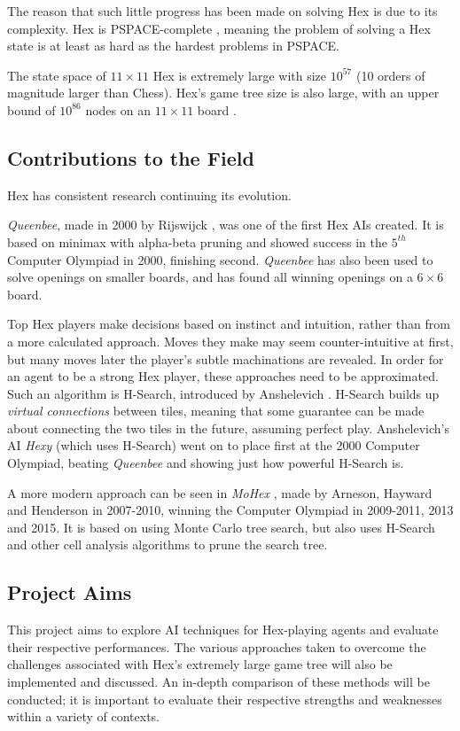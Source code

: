 The reason that such little progress has been made on solving Hex is due to its complexity. Hex is PSPACE-complete \cite{pspace}, meaning the problem of solving a Hex state is at least as hard as the hardest problems in PSPACE.

The state space of $11 \times 11$ Hex is extremely large with size $10^{57}$ (10 orders of magnitude larger than Chess). Hex's game tree size is also large, with an upper bound of $10^{86}$ nodes on an $11 \times 11$ board \cite{hexSize}.



\subsection{Contributions to the Field}
Hex has consistent research continuing its evolution. 

\textit{Queenbee}, made in 2000 by Rijswijck \cite{rijswijck}, was one of the first Hex AIs created. It is based on minimax with alpha-beta pruning and showed success in the $5^{th}$ Computer Olympiad in 2000, finishing second. \textit{Queenbee} has also been used to solve openings on smaller boards, and has found all winning openings on a $6\times6$ board.


Top Hex players make decisions based on instinct and intuition, rather than from a more calculated approach. Moves they make may seem counter-intuitive at first, but many moves later the player's subtle machinations are revealed. In order for an agent to be a strong Hex player, these approaches need to be approximated. Such an algorithm is H-Search, introduced by Anshelevich \cite{HierarchicalHex}. H-Search builds up \textit{virtual connections} between tiles, meaning that some guarantee can be made about connecting the two tiles in the future, assuming perfect play. Anshelevich's AI \textit{Hexy} \cite{HierarchicalHex} (which uses H-Search)  went on to place first at the 2000 Computer Olympiad, beating \textit{Queenbee} and showing just how powerful H-Search is.

A more modern approach can be seen in \textit{MoHex} \cite{MCTSHex}, made by Arneson, Hayward and Henderson in 2007-2010, winning the Computer Olympiad in 2009-2011, 2013 and 2015. It is based on using Monte Carlo tree search, but also uses H-Search and other cell analysis algorithms to prune the search tree. 


\subsection{Project Aims}

This project aims to explore AI techniques for Hex-playing agents and evaluate their respective performances. The various approaches taken to overcome the challenges associated with Hex's extremely large game tree will also be implemented and discussed. An in-depth comparison of these methods will be conducted; it is important to evaluate their respective strengths and weaknesses within a variety of contexts.